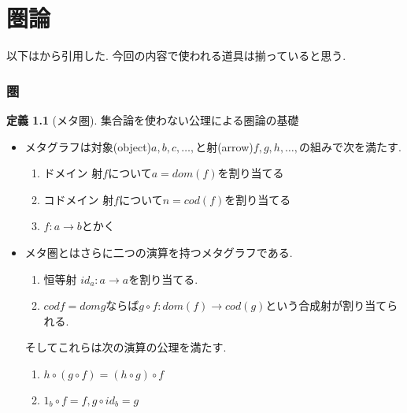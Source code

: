 \documentclass[dvipdfmx,a4paper,11pt]{report}
\theoremstyle{definition}
\newtheorem{dfn}[thm]{定義}
\begin{document}
\chapter{圏論}
以下は\cite{Mac}から引用した.
今回の内容で使われる道具は揃っていると思う. 

\subsection{圏}

 \begin{tcolorbox}
 [colback = white, colframe = green!35!black, fonttitle = \bfseries,breakable = true]
\begin{dfn}[メタ圏]
集合論を使わない公理による圏論の基礎
\begin{itemize}
\item メタグラフは対象(object)$a,b,c,\ldots, $と射(arrow)$f,g,h,\ldots, $の組みで次を満たす.
\begin{enumerate}
\item ドメイン 射$f$について$a = dom(f)$を割り当てる
\item コドメイン 射$f$について$n = cod(f)$を割り当てる
\item $f : a \to b$とかく
\end{enumerate}
\item  メタ圏とはさらに二つの演算を持つメタグラフである.
\begin{enumerate}
\item 恒等射 $id_a : a \to a$を割り当てる.
\item $cod f = dom g$ならば$g \circ f : dom(f) \to cod(g)$という合成射が割り当てられる.
\end{enumerate}
そしてこれらは次の演算の公理を満たす.
\begin{enumerate}
\item $h\circ (g \circ f) = (h\circ g) \circ f$
\item $1_{b} \circ f = f, g \circ id_{b} = g$
\end{enumerate}
\end{itemize}
\end{dfn}
\end{tcolorbox}
\end{document}
